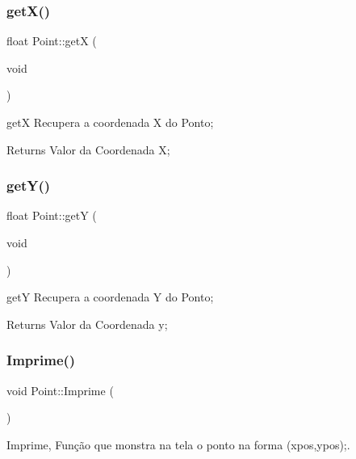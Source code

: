 \subsubsection{\texorpdfstring{get\+X()}{getX()}}
{\footnotesize\ttfamily float Point\+::getX (\begin{DoxyParamCaption}\item[{void}]{ }\end{DoxyParamCaption})}



getX Recupera a coordenada X do Ponto; 

\begin{DoxyReturn}{Returns}
Valor da Coordenada X; 
\end{DoxyReturn}
\mbox{\label{class_point_a2444daa96871c89614510bc4bfcd19ce}} 
\subsubsection{\texorpdfstring{get\+Y()}{getY()}}
{\footnotesize\ttfamily float Point\+::getY (\begin{DoxyParamCaption}\item[{void}]{ }\end{DoxyParamCaption})}



getY Recupera a coordenada Y do Ponto; 

\begin{DoxyReturn}{Returns}
Valor da Coordenada y; 
\end{DoxyReturn}
\mbox{\label{class_point_a7c50a40a930fb7f3adc0f8e7b60b7d79}} 
\subsubsection{\texorpdfstring{Imprime()}{Imprime()}}
{\footnotesize\ttfamily void Point\+::\+Imprime (\begin{DoxyParamCaption}{ }\end{DoxyParamCaption})}



Imprime, Função que monstra na tela o ponto na forma (xpos,ypos);. 

\mbox{\label{class_point_aa3005a9d97e2cb05624414973a214788}} 
